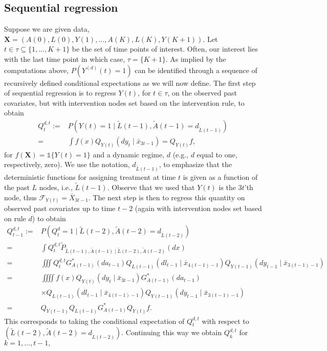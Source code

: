 \documentclass{article}
\newcommand{\A}[1]{A(#1)}
\renewcommand{\L}[1]{L(#1)}
\newcommand{\Y}[1]{Y(#1)}
\newcommand{\Ystar}[2]{Y^{(#1)}(#2)}
\newcommand{\Lbar}[1]{\tilde{L}(#1)}
\newcommand{\Abar}[1]{\tilde{A}(#1)}
\begin{document}
    \subsection{Sequential regression}
    Suppose we are given data, $\textbf{X}=(\A{0},\L{0},\Y{1},...,\A{K},\L{K},\Y{K+1})$. Let $t\in\tau\subseteq\{1,...,K+1\}$ be the set of time points of interest. Often, our interest lies with the last time point in which case, $\tau=\{K+1\}$. As implied by the computations above, $P(\Ystar{d}{t}=1)$ can be identified through a sequence of recursively defined conditional expectations as we will now define. The first step of sequential regression is to regress $\Y{t}$, for $t\in\tau$, on the observed past covariates, but with intervention nodes set based on the intervention rule, to obtain 
    \begin{align*}
        Q_t^{d,t}:=&P(\Y{t}=1\mid \Lbar{t-1},\Abar{t-1}=d_{\Lbar{t-1}})\\
        =&\int f(x)Q_{\Y{t}}(dy_t\mid \bar{x}_{3t-1})=Q_{\Y{t}}f,\tag{Step 1}
    \end{align*} 
    for $f(\textbf{X})=\mathds{1}\{\Y{t}=1\}$ and a dynamic regime, $d$ (e.g., $d$ equal to one, respectively, zero). We use the notation, $d_{\Lbar{t-1}}$, to emphasize that the deterministic functions for assigning treatment at time $t$ is given as a function of the past $L$ nodes, i.e., $\Lbar{t-1}$. Observe that we used that $Y(t)$ is the $3t$'th node, thus $\mathcal{F}_{\Y{t}}=\bar{X}_{3t-1}$. The next step is then to regress this quantity on observed past covariates up to time $t-2$ (again with intervention nodes set based on rule $d$) to obtain
    \begin{align*}
        Q_{t-1}^{d,t}:=&P(Q_{t}^d=1\mid \Lbar{t-2},\Abar{t-2}=d_{\Lbar{t-2}})\\
        =&\int Q_t^{d,t}\tilde{P}_{\Lbar{t-1},\Abar{t-1}\mid \Lbar{t-2},\Abar{t-2}}(dx)\\
        =&\iiint Q_t^{d,t}G^*_{\A{t-1}}(da_{t-1})Q_{\L{t-1}}(dl_{t-1}\mid \bar{x}_{4(t-1)-1})Q_{\Y{t-1}}(dy_{t-1}\mid \bar{x}_{3(t-1)-1})\\
        =&\iiiint f(x) Q_{\Y{t}}(dy_t\mid \bar{x}_{3t-1})G^*_{\A{t-1}}(da_{t-1})\\
        &\times Q_{\L{t-1}}(dl_{t-1}\mid \bar{x}_{4(t-1)-1})Q_{\Y{t-1}}(dy_{t-1}\mid \bar{x}_{3(t-1)-1})\\
        =&Q_{\Y{t-1}}Q_{\L{t-1}}G^*_{\A{t-1}}Q_{\Y{t}}f.\tag{Step 2}
    \end{align*}
    This corresponds to taking the conditional expectation of $Q_t^{d,t}$ with respect to $(\Lbar{t-2},\Abar{t-2}=d_{\Lbar{t-2}})$. Continuing this way we obtain $Q_k^{d,t}$ for $k=1,...,t-1,$
\end{document}
